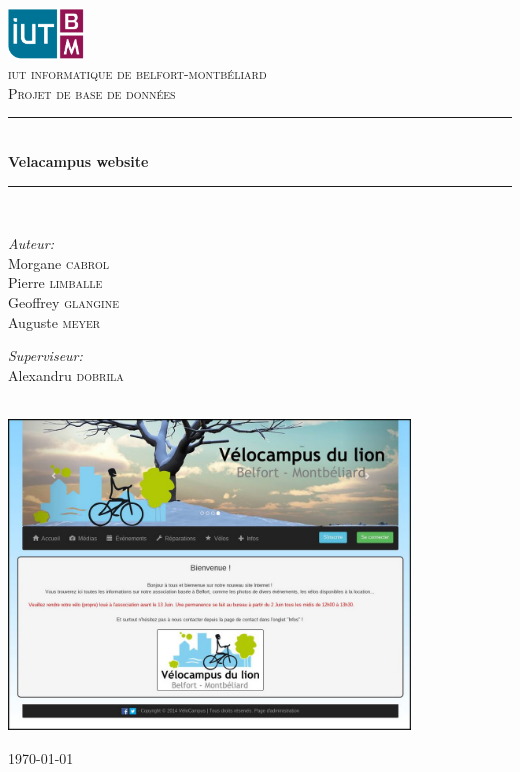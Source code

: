 \documentclass[11pt,a4paper,titlepage]{report}
\newcommand{\HRule}{\rule{\linewidth}{0.5mm}}
\begin{document}
\renewcommand{\thefootnote}{\fnsymbol{footnote}}
\begin{titlepage}
\begin{center}

\includegraphics[width=0.15\textwidth]{logo.png}~
\\[1cm]
\textsc{\LARGE iut informatique de belfort-montbéliard}\\[1cm]

\textsc{\Large Projet de base de données}\\[0.5cm]

\HRule \\[0.4cm]
{ \huge \bfseries Velacampus website \\[0.4cm] }

\HRule \\[1.5cm]

\begin{minipage}{0.4\textwidth}
\begin{flushleft} \large
\emph{Auteur:}\\
Morgane \textsc{cabrol}\\
Pierre \textsc{limballe}\\
Geoffrey \textsc{glangine}\\
Auguste \textsc{meyer}
\end{flushleft}
\end{minipage}
\begin{minipage}{0.4\textwidth}
\begin{flushright} \large
\emph{Superviseur:} \\
Alexandru  \textsc{dobrila}
\end{flushright}
\end{minipage}
\\[1cm]
\includegraphics[width=0.8\textwidth]{site.jpg}~
\\[1cm]
\vfill

{\large \today}

\end{center}
\end{titlepage}
\end{document}
